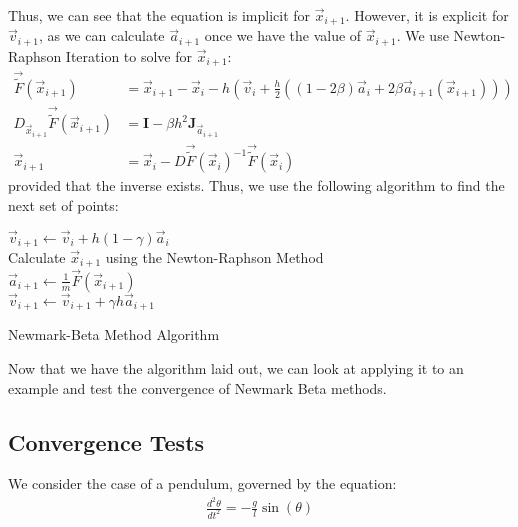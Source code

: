\documentclass[../Main.tex]{subfiles}
\begin{document}
Thus, we can see that the equation is implicit for $\vec{x}_{i+1}$. However, it is explicit for $\vec{v}_{i+1}$, as we can calculate $\vec{a}_{i+1}$ once we have the value of $\vec{x}_{i+1}$.  We use Newton-Raphson Iteration to solve for $\vec{x}_{i+1}$:
\begin{align}
	\vec{\tilde{F}}\left(\vec{x}_{i+1}\right) & = \vec{x}_{i+1} - \vec{x}_{i} -h\left(\vec{v}_{i} + \frac{h}{2}\left(\left(1-2\beta\right)\vec{a}_{i} + 2\beta\vec{a}_{i+1}\left(\vec{x}_{i+1}\right)\right)\right) \nonumber \\
	D_{\vec{x}_{i+1}}\vec{\tilde{F}}\left(\vec{x}_{i+1}\right) & = \textbf{I} -  \beta h^{2}\textbf{J}_{\vec{a}_{i+1}} \nonumber \\
	\vec{x}_{i+1} & = \vec{x}_{i} - D\vec{\tilde{F}}\left(\vec{x}_{i}\right)^{-1}\vec{\tilde{F}}\left(\vec{x}_{i}\right) \label{eqn:newton-raphson_final_step}
\end{align}
provided that the inverse exists. Thus, we use the following algorithm to find the next set of points: \\
\begin{algorithm}[H]
\SetAlgoLined
{}

\BlankLine

$\vec{v}_{i+1} \leftarrow \vec{v}_{i} + h\left(1-\gamma\right)\vec{a}_{i}$\\
Calculate $\vec{x}_{i+1}$ using the Newton-Raphson Method \\
$\vec{a}_{i+1} \leftarrow \frac{1}{m}\vec{F}\left(\vec{x}_{i+1}\right)$\\
$\vec{v}_{i+1} \leftarrow \vec{v}_{i+1} + \gamma h\vec{a}_{i+1}$ 
\caption{Newmark-Beta Method Algorithm}
\label{algorithm:newmark-beta}
\end{algorithm}
\BlankLine
Now that we have the algorithm laid out, we can look at applying it to an example and test the convergence of Newmark Beta methods.

\subsection{Convergence Tests}

We consider the case of a pendulum, governed by the equation:
\begin{align}
\frac{d^2\theta}{dt^2} = -\frac{g}{l}\sin(\theta)
\end{align}
\end{document}
